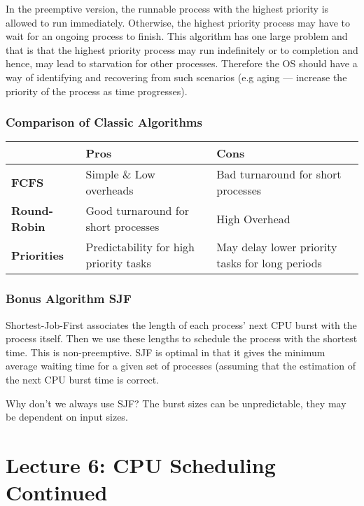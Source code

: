 \documentclass{article}%
\begin{document}
\medskip
In the preemptive version, the runnable process with the highest priority is allowed to run immediately.
Otherwise, the highest priority process may have to wait for an ongoing process to finish.
This algorithm has one large problem and that is that the highest priority process may run indefinitely or to completion and hence, may lead to starvation for other processes.
Therefore the OS should have a way of identifying and recovering from such scenarios (e.g aging --- increase the priority of the process as time progresses).

\subsubsection{Comparison of Classic Algorithms}
\begin{center}
	\begin{tabular}{|m{5em}|m{12em}|m{12em}|}
\hline
& Pros & Cons \\
\hline
\textbf{FCFS} & Simple \& Low overheads & Bad turnaround for short processes \\
\hline
\textbf{Round-Robin} &
Good turnaround for short processes & High Overhead \\
\hline
\textbf{Priorities} & Predictability for high priority tasks & May delay lower priority tasks for long periods \\
\hline
\end{tabular}
\end{center}

\subsubsection{Bonus Algorithm SJF}
Shortest-Job-First associates the length of each process' next CPU burst with the process itself.
Then we use these lengths to schedule the process with the shortest time.
This is non-preemptive.
SJF is optimal in that it gives the minimum average waiting time for a given set of processes (assuming that the estimation of the next CPU burst time is correct.

Why don't we always use SJF?
The burst sizes can be unpredictable, they may be dependent on input sizes.


\maketitle
\section{Lecture 6: CPU Scheduling Continued}
\newpage
\end{document}
